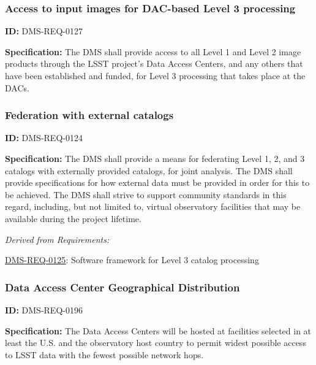 \documentclass[SE,toc,lsstdraft]{lsstdoc}
\begin{document}
\subsubsection{Access to input images for DAC-based Level 3 processing}

\label{DMS-REQ-0127}
\textbf{ID:} DMS-REQ-0127

\textbf{Specification:} The DMS shall provide access to all Level 1 and Level 2 image products through the LSST project's Data Access Centers, and any others that have been established and funded, for Level 3 processing that takes place at the DACs.






\subsubsection{Federation with external catalogs}

\label{DMS-REQ-0124}
\textbf{ID:} DMS-REQ-0124

\textbf{Specification: }The DMS shall provide a means for federating Level 1, 2, and 3 catalogs with externally provided catalogs, for joint analysis.  The DMS shall provide specifications for how external data must be provided in order for this to be achieved. The DMS shall strive to support community standards in this regard, including, but not limited to, virtual observatory facilities that may be available during the project lifetime.






\emph{Derived from Requirements:}

\hyperref[DMS-REQ-0125]{DMS-REQ-0125}:
Software framework for Level 3 catalog processing \newline


\subsubsection{Data Access Center Geographical Distribution}

\label{DMS-REQ-0196}
\textbf{ID:} DMS-REQ-0196

\textbf{Specification:} The Data Access Centers will be hosted at facilities selected in at least the U.S. and the observatory host country to permit widest possible access to LSST data with the fewest possible network hops.
\end{document}
